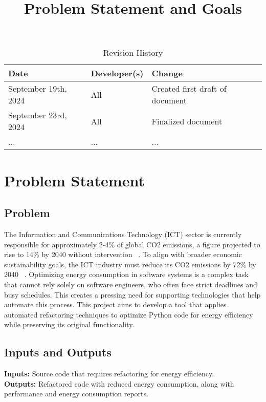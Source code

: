 \documentclass{article}
\title{Problem Statement and Goals\\\progname}
\author{\authname}
\date{}
\begin{document}
\maketitle

\begin{table}[hp]
  \caption{Revision History} \label{TblRevisionHistory}
  \begin{tabularx}{\textwidth}{llX}
    \toprule
    \textbf{Date} & \textbf{Developer(s)} & \textbf{Change}\\
    \midrule
    September 19th, 2024 & All & Created first draft of document\\
    September 23rd, 2024 & All & Finalized document\\
    ... & ... & ...\\
    \bottomrule
  \end{tabularx}
\end{table}

\newpage

\section{Problem Statement}

\subsection{Problem}

The Information and Communications Technology (ICT) sector is currently responsible for approximately 2-4\% of global CO2 emissions, a figure projected to rise to 14\% by 2040 without intervention ~\citep{BelkhirAndElmeligi2018}. To align with broader economic sustainability goals, the ICT industry must reduce its CO2 emissions by 72\% by 2040 ~\citep{FreitagAndBernersLee2021}. Optimizing energy consumption in software systems is a complex task that cannot rely solely on software engineers, who often face strict deadlines and busy schedules. This creates a pressing need for supporting technologies that help automate this process. This project aims to develop a tool that applies automated refactoring techniques to optimize Python code for energy efficiency while preserving its original functionality. 

\subsection{Inputs and Outputs}

\textbf{Inputs:} Source code that requires refactoring for energy efficiency. \\
\textbf{Outputs:} Refactored code with reduced energy consumption, along with performance and energy consumption reports.
\end{document}

